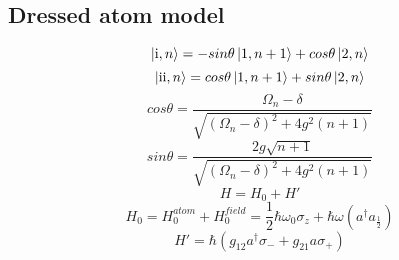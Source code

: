 \documentclass{article}
\newcommand{\RN}[1]{%
  \textup{\uppercase\expandafter{\romannumeral#1}}%
}
\begin{document}
\subsection{Dressed atom model}
\begin{equation*}
    \ket{\RN{1},n}= -sin\theta \ket{1,n+1}+cos\theta \ket{2,n}
\end{equation*}
\begin{equation*}
    \ket{\RN{2},n}= cos\theta \ket{1,n+1}+sin\theta \ket{2,n}
\end{equation*}
\begin{equation*}
    cos\theta = \frac{\Omega_n -\delta}{\sqrt{(\Omega_n -\delta)^2+4g^2(n+1)}}
\end{equation*}
\begin{equation*}
    sin\theta = \frac{2g\sqrt{n+1}}{\sqrt{(\Omega_n-\delta)^2+4g^2(n+1)}}
\end{equation*}
\begin{equation*}
    H=H_0+H'
\end{equation*}
\begin{equation*}
    H_0=H_0^{atom}+H_0^{field}=\frac{1}{2}\hbar\omega_0\sigma_z + \hbar\omega(a^\dagger a _\frac{1}{2})
\end{equation*}
\begin{equation*}
    H'=\hbar(g_{12}a^\dagger\sigma_{-}+g_{21}a\sigma_{+})
\end{equation*}
\end{document}
